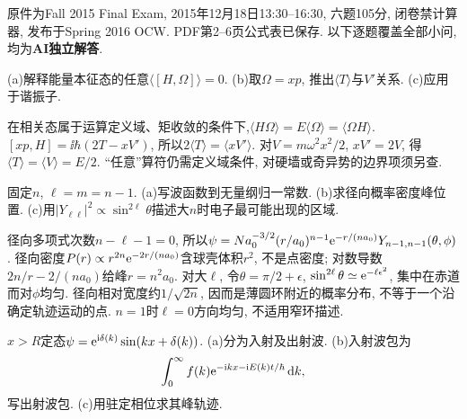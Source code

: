 原件为Fall 2015 Final Exam, 2015年12月18日13:30--16:30, 六题105分, 闭卷禁计算器, 发布于Spring 2016 OCW. PDF第2--6页公式表已保存. 以下逐题覆盖全部小问, 均为\textbf{AI独立解答}.
\begin{exercise}
(a)解释能量本征态的任意$\langle[H,\Omega]\rangle=0$. (b)取$\Omega=xp$, 推出$\langle T\rangle$与$V'$关系. (c)应用于谐振子.
\end{exercise}
\begin{solution}
在相关态属于运算定义域、矩收敛的条件下,$\langle H\Omega\rangle=E\langle\Omega\rangle=\langle\Omega H\rangle$. $[xp,H]=\ii\hbar(2T-xV')$, 所以$2\langle T\rangle=\langle xV'\rangle$. 对$V=m\omega^2x^2/2$, $xV'=2V$, 得$\langle T\rangle=\langle V\rangle=E/2$. “任意”算符仍需定义域条件, 对硬墙或奇异势的边界项须另查.
\end{solution}
\begin{exercise}
固定$n$, $\ell=m=n-1$. (a)写波函数到无量纲归一常数. (b)求径向概率密度峰位置. (c)用$|Y_{\ell\ell}|^2\propto\sin^{2\ell}\theta$描述大$n$时电子最可能出现的区域.
\end{exercise}
\begin{solution}
径向多项式次数$n-\ell-1=0$, 所以$\psi=N a_0^{-3/2}(r/a_0)^{n-1}\mathrm e^{-r/(na_0)}Y_{n-1,n-1}(\theta,\phi)$. 径向密度$P(r)\propto r^{2n}\mathrm e^{-2r/(na_0)}$含球壳体积$r^2$, 不是点密度; 对数导数$2n/r-2/(na_0)$给峰$r=n^2a_0$. 对大$\ell$, 令$\theta=\pi/2+\epsilon$, $\sin^{2\ell}\theta\simeq\mathrm e^{-\ell\epsilon^2}$, 集中在赤道而对$\phi$均匀. 径向相对宽度约$1/\sqrt{2n}$, 因而是薄圆环附近的概率分布, 不等于一个沿确定轨迹运动的点. $n=1$时$\ell=0$方向均匀, 不适用窄环描述.
\begin{center}\end{center}
\end{solution}
\begin{exercise}
$x>R$定态$\psi=\mathrm e^{\mathrm i\delta(k)}\sin(kx+\delta(k))$. (a)分为入射及出射波. (b)入射波包为
\[
\int_0^\infty f(k)\mathrm e^{-\mathrm i kx-\mathrm i E(k)t/\hbar}\,\mathrm d k,
\]
写出射波包. (c)用驻定相位求其峰轨迹.
\end{exercise}
